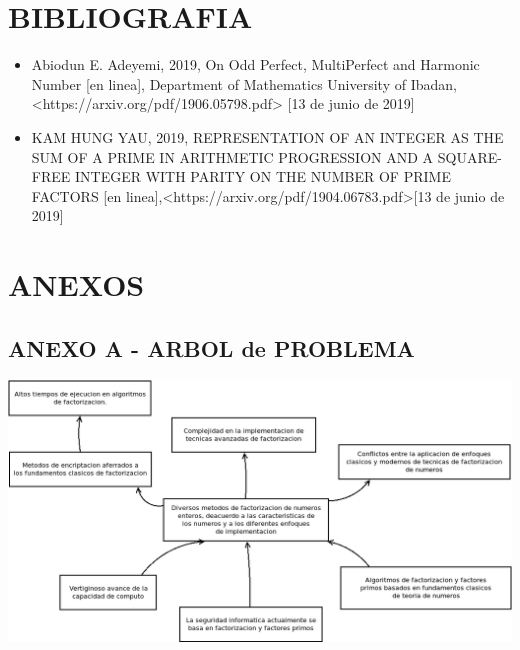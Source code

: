 \documentclass[12pt,letterpaper]{book}
\begin{document}
    \chapter{BIBLIOGRAFIA}
    \begin{itemize}
        \item{Abiodun E. Adeyemi, 2019, On Odd Perfect, MultiPerfect and Harmonic Number [en linea], Department of Mathematics University of Ibadan,<https://arxiv.org/pdf/1906.05798.pdf> [13 de junio de 2019]}
        \item{KAM HUNG YAU, 2019, REPRESENTATION OF AN INTEGER AS THE SUM OF A PRIME IN ARITHMETIC PROGRESSION AND A SQUARE-FREE INTEGER WITH PARITY ON THE NUMBER OF PRIME FACTORS [en linea],<https://arxiv.org/pdf/1904.06783.pdf>[13 de junio de 2019]}
    \end{itemize}
    
    \chapter{ANEXOS}
    \section{ANEXO A - ARBOL de PROBLEMA}
    \includegraphics[scale=0.5]{images/arbol_problemas.png}


    

    

        
	
	
	
% 	
% 		
		
	
\end{document}

